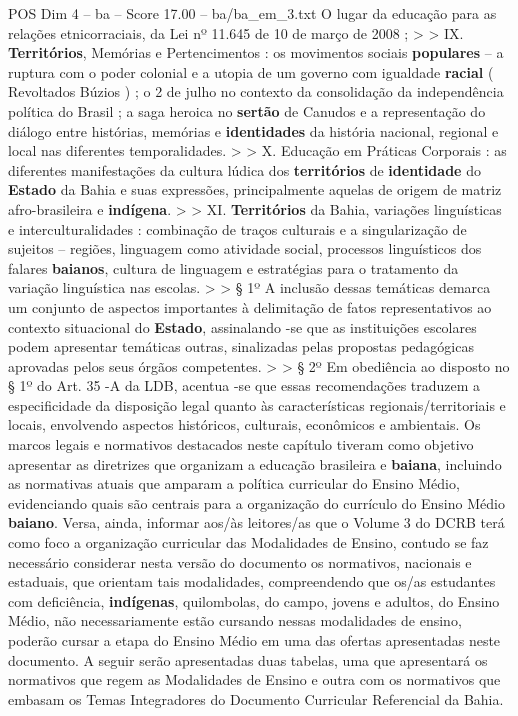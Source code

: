 \begin{textsample}{POS Dim 4 – ba – Score 17.00 – ba/ba\_em\_3.txt}
O lugar da educação para as relações etnicorraciais, da Lei nº 11.645 de 10 de março de 2008 ; > > IX. \textbf{Territórios}, Memórias e Pertencimentos : os movimentos sociais \textbf{populares} – a ruptura com o poder colonial e a utopia de um governo com igualdade \textbf{racial} ( Revoltados Búzios ) ; o 2 de julho no contexto da consolidação da independência política do Brasil ; a saga heroica no \textbf{sertão} de Canudos e a representação do diálogo entre histórias, memórias e \textbf{identidades} da história nacional, regional e local nas diferentes temporalidades. > > X.
Educação em Práticas Corporais : as diferentes manifestações da cultura lúdica dos \textbf{territórios} de \textbf{identidade} do \textbf{Estado} da Bahia e suas expressões, principalmente aquelas de origem de matriz afro-brasileira e \textbf{indígena}. > > XI. \textbf{Territórios} da Bahia, variações linguísticas e interculturalidades : combinação de traços culturais e a singularização de sujeitos – regiões, linguagem como atividade social, processos linguísticos dos falares \textbf{baianos}, cultura de linguagem e estratégias para o tratamento da variação linguística nas escolas. > > § 1º A inclusão dessas temáticas demarca um conjunto de aspectos importantes à delimitação de fatos representativos ao contexto situacional do \textbf{Estado}, assinalando -se que as instituições escolares podem apresentar temáticas outras, sinalizadas pelas propostas pedagógicas aprovadas pelos seus órgãos competentes. > > § 2º Em obediência ao disposto no § 1º do Art. 35 -A da LDB, acentua -se que essas recomendações traduzem a especificidade da disposição legal quanto às características regionais/territoriais e locais, envolvendo aspectos históricos, culturais, econômicos e ambientais.
Os marcos legais e normativos destacados neste capítulo tiveram como objetivo apresentar as diretrizes que organizam a educação brasileira e \textbf{baiana}, incluindo as normativas atuais que amparam a política curricular do Ensino Médio, evidenciando quais são centrais para a organização do currículo do Ensino Médio \textbf{baiano}.
Versa, ainda, informar aos/às leitores/as que o Volume 3 do DCRB terá como foco a organização curricular das Modalidades de Ensino, contudo se faz necessário considerar nesta versão do documento os normativos, nacionais e estaduais, que orientam tais modalidades, compreendendo que os/as estudantes com deficiência, \textbf{indígenas}, quilombolas, do campo, jovens e adultos, do Ensino Médio, não necessariamente estão cursando nessas modalidades de ensino, poderão cursar a etapa do Ensino Médio em uma das ofertas apresentadas neste documento.
A seguir serão apresentadas duas tabelas, uma que apresentará os normativos que regem as Modalidades de Ensino e outra com os normativos que embasam os Temas Integradores do Documento Curricular Referencial da Bahia.

\end{textsample}
